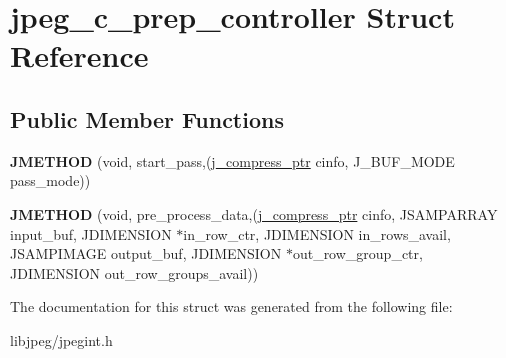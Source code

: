 \hypertarget{structjpeg__c__prep__controller}{\section{jpeg\-\_\-c\-\_\-prep\-\_\-controller Struct Reference}
\label{structjpeg__c__prep__controller}
}
\subsection*{Public Member Functions}
\begin{DoxyCompactItemize}
\item 
\hypertarget{structjpeg__c__prep__controller_af2fb43bbf035ffe6b1a28fb2382db63d}{{\bfseries J\-M\-E\-T\-H\-O\-D} (void, start\-\_\-pass,(\hyperlink{structjpeg__compress__struct}{j\-\_\-compress\-\_\-ptr} cinfo, J\-\_\-\-B\-U\-F\-\_\-\-M\-O\-D\-E pass\-\_\-mode))}\label{structjpeg__c__prep__controller_af2fb43bbf035ffe6b1a28fb2382db63d}

\item 
\hypertarget{structjpeg__c__prep__controller_a84100e06666ea90e6734dce2a10af554}{{\bfseries J\-M\-E\-T\-H\-O\-D} (void, pre\-\_\-process\-\_\-data,(\hyperlink{structjpeg__compress__struct}{j\-\_\-compress\-\_\-ptr} cinfo, J\-S\-A\-M\-P\-A\-R\-R\-A\-Y input\-\_\-buf, J\-D\-I\-M\-E\-N\-S\-I\-O\-N $\ast$in\-\_\-row\-\_\-ctr, J\-D\-I\-M\-E\-N\-S\-I\-O\-N in\-\_\-rows\-\_\-avail, J\-S\-A\-M\-P\-I\-M\-A\-G\-E output\-\_\-buf, J\-D\-I\-M\-E\-N\-S\-I\-O\-N $\ast$out\-\_\-row\-\_\-group\-\_\-ctr, J\-D\-I\-M\-E\-N\-S\-I\-O\-N out\-\_\-row\-\_\-groups\-\_\-avail))}\label{structjpeg__c__prep__controller_a84100e06666ea90e6734dce2a10af554}

\end{DoxyCompactItemize}


The documentation for this struct was generated from the following file\-:\begin{DoxyCompactItemize}
\item 
libjpeg/jpegint.\-h\end{DoxyCompactItemize}
